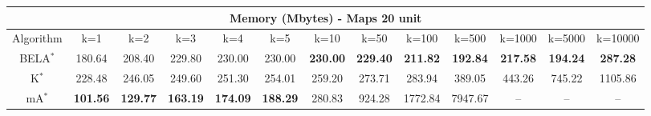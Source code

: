 \begin{tabular}{c|cccccccccccc}\toprule
\multicolumn{13}{c}{Memory (Mbytes) - Maps 20 unit}\\ \midrule
Algorithm & k=1 & k=2 & k=3 & k=4 & k=5 & k=10 & k=50 & k=100 & k=500 & k=1000 & k=5000 & k=10000 \\ \midrule
BELA$^*$ & 180.64 & 208.40 & 229.80 & 230.00 & 230.00 & \textbf{230.00} & \textbf{229.40} & \textbf{211.82} & \textbf{192.84} & \textbf{217.58} & \textbf{194.24} & \textbf{287.28} \\
K$^*$ & 228.48 & 246.05 & 249.60 & 251.30 & 254.01 & 259.20 & 273.71 & 283.94 & 389.05 & 443.26 & 745.22 & 1105.86 \\
mA$^*$ & \textbf{101.56} & \textbf{129.77} & \textbf{163.19} & \textbf{174.09} & \textbf{188.29} & 280.83 & 924.28 & 1772.84 & 7947.67 & -- & -- & -- \\ \bottomrule 
\end{tabular}
